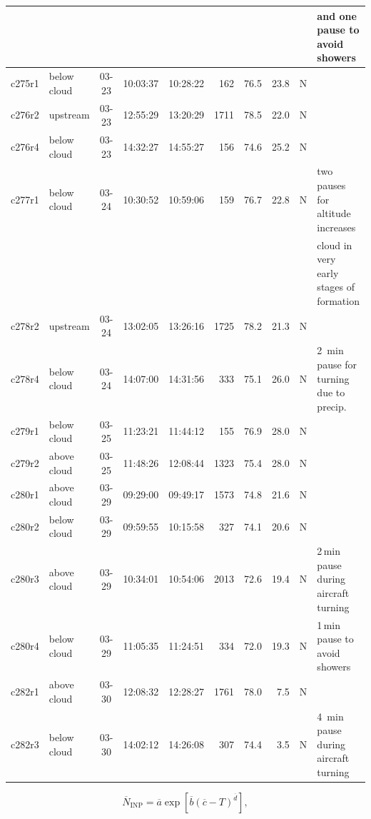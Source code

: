 \begin{table}
\begin{tabular}{llcccrrrll}
    &&&&&&&&&and one pause to avoid showers\\
    \hline
    {c275r1} & below cloud & 03-23 & 10:03:37 & 10:28:22 & 162 & 76.5 & 23.8 & N & ~  \\
    \hline
    {c276r2} & upstream & 03-23 & 12:55:29 & 13:20:29 & 1711 & 78.5 & 22.0 & N & ~  \\
    \hline
    {c276r4} & below cloud & 03-23 & 14:32:27 & 14:55:27 & 156 & 74.6 & 25.2 & N & ~  \\
    \hline
    {c277r1} & below cloud & 03-24 & 10:30:52 & 10:59:06 & 159 & 76.7 & 22.8 & N & two pauses for altitude increases \\
    &&&&&&&&&cloud in very early stages of formation \\
    \hline
    {c278r2} & upstream & 03-24 & 13:02:05 & 13:26:16 & 1725 & 78.2 & 21.3 & N & ~  \\
    \hline
    {c278r4} & below cloud & 03-24 & 14:07:00 & 14:31:56 & 333 & 75.1 & 26.0 & N & \qty{2}{\minute} pause for turning due to precip. \\
    \hline
    {c279r1} & below cloud & 03-25 & 11:23:21 & 11:44:12 & 155 & 76.9 & 28.0 & N & ~  \\
    \hline
    {c279r2} & above cloud & 03-25 & 11:48:26 & 12:08:44 & 1323 & 75.4 & 28.0 & N & ~  \\
    \hline
    {c280r1} & above cloud & 03-29 & 09:29:00 & 09:49:17 & 1573 & 74.8 & 21.6 & N & ~  \\
    \hline
    {c280r2} & below cloud & 03-29 & 09:59:55 & 10:15:58 & 327 & 74.1 & 20.6 & N & ~  \\
    \hline
    {c280r3} & above cloud & 03-29 & 10:34:01 & 10:54:06 & 2013 & 72.6 & 19.4 & N & 2\,min pause during aircraft turning\\
    \hline
    {c280r4} & below cloud & 03-29 & 11:05:35 & 11:24:51 & 334 & 72.0 & 19.3 & N & 1\,min pause to avoid showers \\
    \hline
    {c282r1} & above cloud & 03-30 & 12:08:32 & 12:28:27 & 1761 & 78.0 & 7.5 & N & ~  \\
    \hline
    {c282r3} & below cloud & 03-30 & 14:02:12  & 14:26:08 & 307 & 74.4 & 3.5 & N & \qty{4}{\minute} pause during aircraft turning  \\
    \hline\hline
    \end{tabular}
   \label{tab:filter_table}
\end{table}


\begin{equation}
    \label{eq:median_INP}
    \overline{N}_\mathrm{INP} = \overline{a} \exp{\left[\overline{b}\left(\overline{c}-T\right)^{\overline{d}}\right]},
\end{equation}




